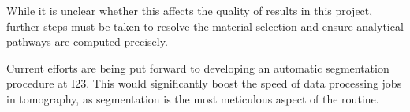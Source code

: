 While it is unclear whether this affects the quality of results in this project, further steps must be taken to resolve the material selection and ensure analytical pathways are computed precisely.

Current efforts are being put forward to developing an automatic segmentation procedure at I23. This would significantly boost the speed of data processing jobs in tomography, as segmentation is the most meticulous aspect of the routine.



